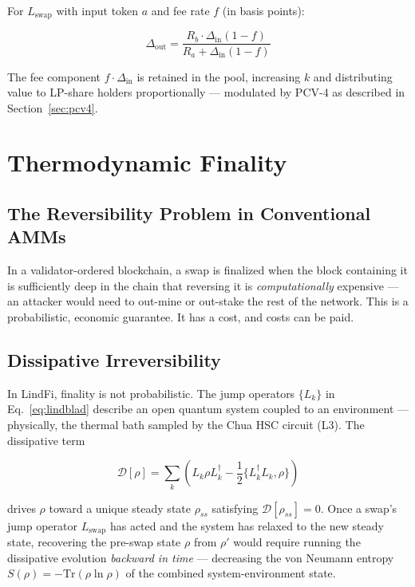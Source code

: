 \documentclass[11pt,a4paper]{article}
\begin{document}
For $L_{\text{swap}}$ with input token $a$ and fee rate $f$ (in basis points):

\begin{equation}
    \Delta_{\text{out}} = \frac{R_b \cdot \Delta_{\text{in}}(1-f)}{R_a + \Delta_{\text{in}}(1-f)}
    \label{eq:swap}
\end{equation}

The fee component $f \cdot \Delta_{\text{in}}$ is retained in the pool, increasing $k$ and distributing value to LP-share holders proportionally --- modulated by PCV-4 as described in Section~\ref{sec:pcv4}.

\section{Thermodynamic Finality}
\label{sec:finality}

\subsection{The Reversibility Problem in Conventional AMMs}

In a validator-ordered blockchain, a swap is finalized when the block containing it is sufficiently deep in the chain that reversing it is \emph{computationally} expensive --- an attacker would need to out-mine or out-stake the rest of the network. This is a probabilistic, economic guarantee. It has a cost, and costs can be paid.

\subsection{Dissipative Irreversibility}

In LindFi, finality is not probabilistic. The jump operators $\{L_k\}$ in Eq.~\eqref{eq:lindblad} describe an open quantum system coupled to an environment --- physically, the thermal bath sampled by the Chua HSC circuit (L3). The dissipative term

\begin{equation}
    \mathcal{D}[\rho] = \sum_k \left( L_k \rho L_k^\dagger - \frac{1}{2}\{L_k^\dagger L_k, \rho\} \right)
    \label{eq:dissipator}
\end{equation}

drives $\rho$ toward a unique steady state $\rho_{ss}$ satisfying $\mathcal{D}[\rho_{ss}] = 0$. Once a swap's jump operator $L_{\text{swap}}$ has acted and the system has relaxed to the new steady state, recovering the pre-swap state $\rho$ from $\rho'$ would require running the dissipative evolution \emph{backward in time} --- decreasing the von Neumann entropy $S(\rho) = -\text{Tr}(\rho \ln \rho)$ of the combined system-environment state.
\end{document}
